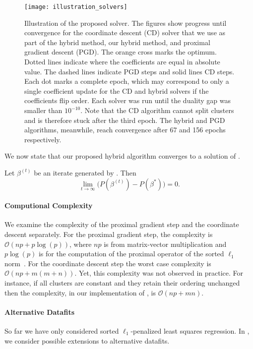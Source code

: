 \begin{figure*}[htb]
  \centering
  \texttt{[image: illustration\_solvers]}
  \caption{Illustration of the proposed solver. The figures show progress
    until convergence for the coordinate descent (CD) solver that we use as part
    of the hybrid method, our hybrid method, and  proximal gradient descent
    (PGD). The orange cross marks the optimum. Dotted lines indicate where the
    coefficients are equal in absolute value. The dashed lines indicate PGD
    steps and solid lines CD steps. Each dot marks a complete epoch, which may
    correspond to only a single coefficient update for the CD and hybrid
    solvers if the coefficients flip order. Each solver was run until the duality
    gap was smaller than \(10^{-10}\). Note that the CD algorithm cannot split clusters
    and is therefore stuck after the third epoch. The hybrid and PGD algorithms,
    meanwhile, reach convergence after 67 and 156 epochs respectively.}
  \label{fig:illustration-solver}
\end{figure*}

We now state that our proposed hybrid algorithm converges to a solution of .

\begin{lemma}
  \label{lem:convergence}
  Let \(\beta^{(t)}\) be an iterate generated by . Then
  \[
    \lim_{t \rightarrow \infty}\big(P(\beta^{(t)}) - P(\beta^*)\big) = 0.
  \]
\end{lemma}

\paragraph{Computional Complexity}
We examine the complexity of the proximal gradient step and the coordinate
descent separately. For the proximal gradient step, the complexity is $\mathcal{O}(np
+ p\log(p))$, where $np$ is from matrix-vector multiplication and $p\log(p)$ is
for the computation of the proximal operator of the sorted $\ell_1$ norm~\parencite{zeng2014ordered}.
For the coordinate descent step the worst case complexity is  $\mathcal{O}(np + m(m + n))$.
Yet, this complexity was not observed in practice. For instance, if all clusters are
constant and they retain their ordering unchanged then the complexity, in our
implementation of , is $\mathcal{O}(np + mn)$.


\paragraph{Alternative Datafits}
So far we have only considered sorted \(\ell_1\)-penalized least squares regression.
In , we consider possible extensions to alternative datafits.

